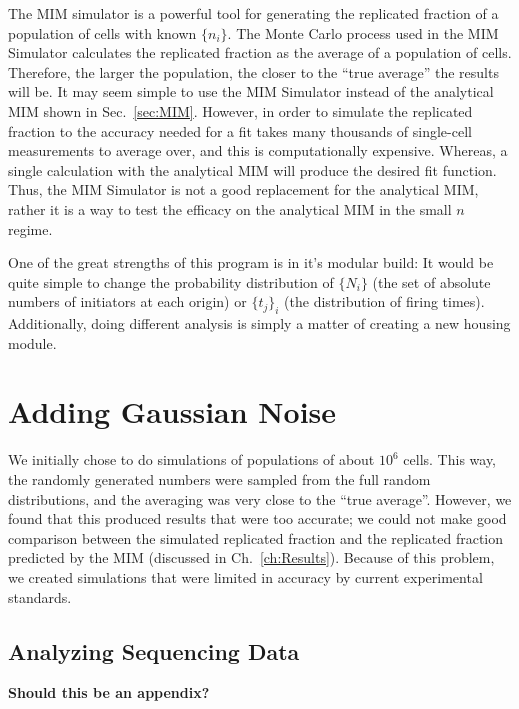 		The MIM simulator is a powerful tool for generating the replicated fraction of a population of cells with known $\{n_i\}$.
		The Monte Carlo process used in the MIM Simulator calculates the replicated fraction as the average of a population of cells.
		Therefore, the larger the population, the closer to the ``true average'' the results will be.
		It may seem simple to use the MIM Simulator instead of the analytical MIM shown in Sec.~\ref{sec:MIM}.
		However, in order to simulate the replicated fraction to the accuracy needed for a fit takes many thousands of single-cell measurements to average over, and this is computationally expensive.
		Whereas, a single calculation with the analytical MIM will produce the desired fit function.
		Thus, the MIM Simulator is not a good replacement for the analytical MIM, rather it is a way to test the efficacy on the analytical MIM in the small $n$ regime.
		
		One of the great strengths of this program is in it's modular build: It would be quite simple to change the probability distribution of $\{N_i\}$ (the set of absolute numbers of initiators at each origin) or $\{t_j\}_i$ (the distribution of firing times).
		Additionally, doing different analysis is simply a matter of creating a new housing module.
		
		
	\section{Adding Gaussian Noise}
	\label{sec:Noise}
	
	We initially chose to do simulations of populations of about $10^6$ cells.
	This way, the randomly generated numbers were sampled from the full random distributions, and the averaging was very close to the ``true average''.
	However, we found that this produced results that were too accurate; we could not make good comparison between the simulated replicated fraction and the replicated fraction predicted by the MIM (discussed in Ch.~\ref{ch:Results}).
	Because of this problem, we created simulations that were limited in accuracy by current experimental standards.
	
	
		\subsection{Analyzing Sequencing Data}
		\label{subsec:SequencingNoise}
		
		\textbf{Should this be an appendix?}
		
